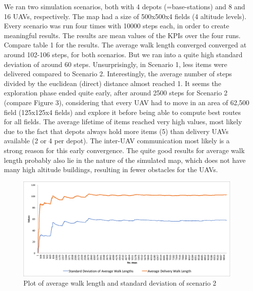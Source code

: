 We ran two simulation scenarios, both with 4 depots (=base-stations) and 8 and 
16 UAVs, respectively. The map had a size of 500x500x4 fields (4 altitude 
levels). Every scenario was run four times with 10000 steps each, in order to 
create meaningful results. The results are mean values of the KPIs over the 
four runs. Compare table 1 for the results. The average walk length converged 
converged at around 102-106 steps, for both scenarios. But we ran into a quite 
high standard deviation of around 60 steps. Unsurprisingly, in Scenario 1, less 
items were delivered compared to Scenario 2. Interestingly, the average number 
of steps divided by the euclidean (direct) distance almost reached 1. 
It seems 
the exploration phase ended quite early, after around 
2500 steps for Scenario 2 (compare Figure 3), considering that every UAV had 
to move in an area of 62,500 field (125x125x4 fields) and explore it before 
being able to compute best routes for all fields. The average lifetime of items 
reached very high values, most likely due to the fact that depots always hold 
more items (5) than delivery UAVs available (2 or 4 per depot). The inter-UAV 
communication most likely is a strong reason for this early convergence. The 
quite good results for average walk length probably also lie in the nature of 
the simulated map, which does not have many high altitude buildings, resulting 
in fewer obstacles for the UAVs.
 
 \begin{figure}\label{fig:eval}
 \centering
 \includegraphics[width=\textwidth]{images/graph}
 \caption{Plot of average walk length and standard deviation of scenario 2}
 \end{figure}

